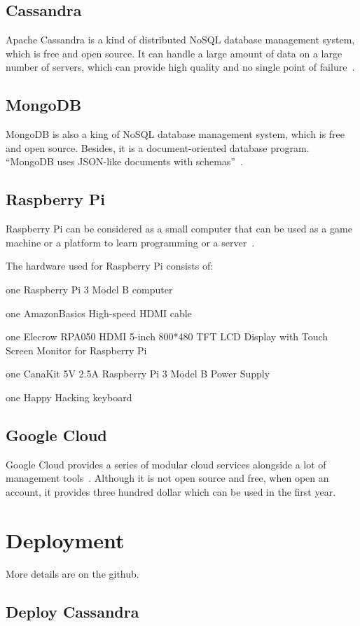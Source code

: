 \subsection{Cassandra}
Apache Cassandra is a kind of distributed NoSQL database management 
system, which is free and open source. It can handle a large amount of 
data on a large number of servers, which can provide high quality and no 
single point of failure~\cite{hid-sp18-508-cassandra}. 

\subsection{MongoDB}
MongoDB is also a king of NoSQL database management system, which 
is free and open source. Besides, it is a document-oriented database 
program. ``MongoDB uses JSON-like documents with 
schemas''~\cite{hid-sp18-508-mongodb}.

\subsection{Raspberry Pi}
Raspberry Pi can be considered as a small computer that can be used 
as a game machine or a platform to learn programming or a 
server~\cite{hid-sp18-508-raspberryPi}.

The hardware used for Raspberry Pi consists of: 

one Raspberry Pi 3 Model B computer

one AmazonBasics High-speed HDMI cable

one Elecrow RPA050 HDMI 5-inch 800*480 TFT LCD Display with Touch
 Screen Monitor for Raspberry Pi
 
one CanaKit 5V 2.5A Raspberry Pi 3 Model B Power Supply

one Happy Hacking keyboard

\subsection{Google Cloud}
Google Cloud provides a series of modular cloud services alongside a lot of
 management tools~\cite{hid-sp18-508-googleCloud}. Although
  it is not open source and free, when open an account,
 it provides three hundred dollar which can be used in the first year.
 
 \section{Deployment}
 More details are on the github.
\subsection{Deploy Cassandra}

